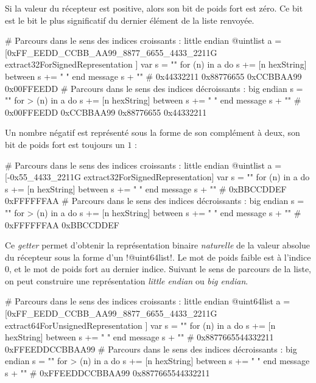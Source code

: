 Si la valeur du récepteur est positive, alors son bit de poids fort est zéro. Ce bit est le bit le plus significatif du dernier élément de la liste renvoyée.

\begin{galgas}
# Parcours dans le sens des indices croissants : little endian
@uintlist a = [0xFF_EEDD_CCBB_AA99_8877_6655_4433_2211G
  extract32ForSignedRepresentation
]
var s = ""
for (n) in a
  do s += [n hexString]
  between s += " "
end
message s + "\n" # 0x44332211 0x88776655 0xCCBBAA99 0x00FFEEDD
# Parcours dans le sens des indices décroissants : big endian
s = ""
for > (n) in a
  do s += [n hexString]
  between s += " "
end
message s + "\n" # 0x00FFEEDD 0xCCBBAA99 0x88776655 0x44332211
\end{galgas}

Un nombre négatif est représenté sous la forme de son complément à deux, son bit de poids fort est toujours un $1$ : 

\begin{galgas}
# Parcours dans le sens des indices croissants : little endian
@uintlist a = [-0x55_4433_2211G extract32ForSignedRepresentation]
var s = ""
for (n) in a
  do s += [n hexString]
  between s += " "
end
message s + "\n" # 0xBBCCDDEF 0xFFFFFFAA
# Parcours dans le sens des indices décroissants : big endian
s = ""
for > (n) in a
  do s += [n hexString]
  between s += " "
end
message s + "\n" # 0xFFFFFFAA 0xBBCCDDEF
\end{galgas}






Ce \emph{getter} permet d'obtenir la représentation binaire \emph{naturelle} de la valeur absolue du récepteur sous la forme d'un \ggs!@uint64list!. Le mot de poids faible est à l'indice $0$, et le mot de poids fort au dernier indice. Suivant le sens de parcours de la liste, on peut construire une représentation \emph{little endian} ou \emph{big endian}.

\begin{galgas}
# Parcours dans le sens des indices croissants : little endian
@uint64list a = [0xFF_EEDD_CCBB_AA99_8877_6655_4433_2211G
  extract64ForUnsignedRepresentation
]
var s = ""
for (n) in a
  do s += [n hexString]
  between s += " "
end
message s + "\n" # 0x8877665544332211 0xFFEEDDCCBBAA99
# Parcours dans le sens des indices décroissants : big endian
s = ""
for > (n) in a
  do s += [n hexString]
  between s += " "
end
message s + "\n" # 0xFFEEDDCCBBAA99 0x8877665544332211
\end{galgas}

